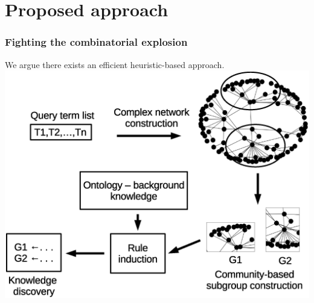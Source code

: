 \documentclass{beamer}
\begin{document}
\section{Proposed approach}
  \begin{frame}\frametitle{Fighting the combinatorial explosion}

    We argue there exists an efficient heuristic-based approach.
      \includegraphics[scale=0.35]{images/workflow2}       
   \end{frame}
\end{document}
